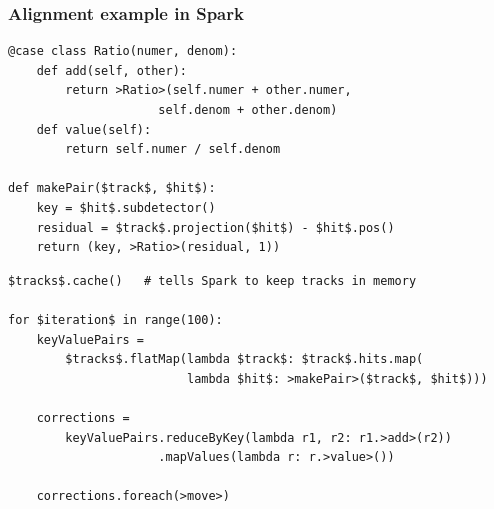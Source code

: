 \documentclass[compress]{beamer}
\begin{document}
\begin{frame}[fragile]
\frametitle{Alignment example in Spark}

\begin{lstlisting}
@case class Ratio(numer, denom):
    def add(self, other):
        return >Ratio>(self.numer + other.numer,
                     self.denom + other.denom)
    def value(self):
        return self.numer / self.denom

def makePair($track$, $hit$):
    key = $hit$.subdetector()
    residual = $track$.projection($hit$) - $hit$.pos()
    return (key, >Ratio>(residual, 1))
\end{lstlisting}

\begin{lstlisting}[frame=single]
$tracks$.cache()   # tells Spark to keep tracks in memory

for $iteration$ in range(100):
    keyValuePairs =
        $tracks$.flatMap(lambda $track$: $track$.hits.map(
                         lambda $hit$: >makePair>($track$, $hit$)))

    corrections =
        keyValuePairs.reduceByKey(lambda r1, r2: r1.>add>(r2))
                     .mapValues(lambda r: r.>value>())

    corrections.foreach(>move>)
\end{lstlisting}
\end{frame}
\end{document}
